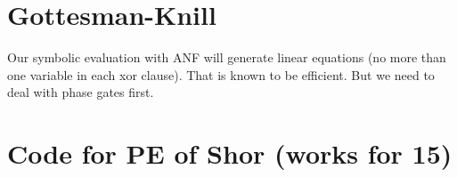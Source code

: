 \documentclass{article}
\begin{document}
\section{Gottesman-Knill}

Our symbolic evaluation with ANF will generate linear equations (no
more than one variable in each xor clause). That is known to be
efficient. But we need to deal with phase gates first. 


\appendix

\section{Code for PE of Shor (works for 15)}
\end{document}
